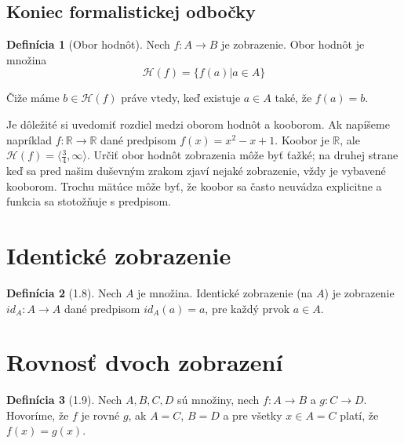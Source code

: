 \documentclass{article}
\theoremstyle{definition}
\newtheorem{definition}{Definícia}
\theoremstyle{plain}
\theoremstyle{remark}
\begin{document}
\subsection*{Koniec formalistickej odbočky}

\begin{definition}[Obor hodnôt]\label{def:oborHodnot}
Nech $f \colon A \rightarrow B$ je zobrazenie. Obor hodnôt je množina
$$ \mathcal{H}(f) = \{f(a) | a \in A\} $$
\end{definition}
Čiže máme $b \in \mathcal{H}(f)$ práve vtedy, keď existuje $a \in A$ také, že $f(a)=b$.

Je dôležité si uvedomiť rozdiel medzi oborom hodnôt a kooborom. Ak napíšeme napríklad
$f \colon \mathbb{R} \rightarrow \mathbb{R}$ dané predpisom $f(x) = x^2 - x + 1$.
Koobor je $\mathbb{R}$, ale $\mathcal{H}(f) = \langle\frac{3}{4}, \infty\rangle$.
Určiť obor hodnôt zobrazenia môže byť ťažké; na druhej strane keď sa pred našim duševným zrakom zjaví nejaké zobrazenie, vždy je vybavené kooborom. Trochu mätúce môže byť, že koobor sa často neuvádza explicitne a funkcia sa stotožňuje s predpisom.

\section*{Identické zobrazenie}
\begin{definition}[1.8]
Nech $A$ je množina. Identické zobrazenie (na $A$) je zobrazenie $id_A \colon A \rightarrow A$ dané predpisom $id_A(a) = a$, pre každý prvok $a \in A$.
\end{definition}

\section*{Rovnosť dvoch zobrazení}
\begin{definition}[1.9]
Nech $A, B, C, D$ sú množiny, nech $f \colon A \rightarrow B$ a $g \colon C \rightarrow D$. Hovoríme, že $f$ je rovné $g$, ak $A=C$, $B=D$ a pre všetky $x \in A=C$ platí, že $f(x)=g(x)$.
\end{definition}
\end{document}
